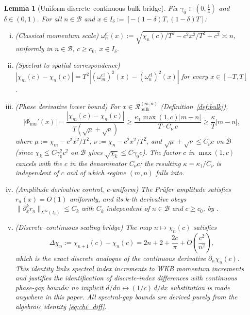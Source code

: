 \documentclass[12pt,a4paper]{amsart}
\newtheorem{lemma}[theorem]{Lemma}
\theoremstyle{definition}
\newcommand{\Rbulk}{\mathcal{R}_{\mathrm{bulk}}}
\begin{document}
\begin{lemma}[Uniform discrete--continuous bulk bridge]%
\label{lem:discrete_continuous_bridge}
Fix $\gamma_0\in(0,\tfrac{1}{4})$ and $\delta\in(0,1)$. For all
$n\in\mathcal{B}$ and $x\in I_\delta:=[-(1-\delta)T,(1-\delta)T]$:
\begin{enumerate}[(i)]
\item \textup{(Classical momentum scale)}
  $\omega_n^{\mathrm{cl}}(x)
  :=\sqrt{\chi_n(c)/T^2-c^2x^2/T^2+c^2}\asymp n$,
  uniformly in $n\in\mathcal{B}$, $c\ge c_0$, $x\in I_\delta$.
\item \textup{(Spectral-to-spatial correspondence)}
  $|\chi_m(c)-\chi_n(c)|
  =T^2|(\omega_m^{\mathrm{cl}})^2(x)-(\omega_n^{\mathrm{cl}})^2(x)|$
  for every $x\in[-T,T]$.
\item \textup{(Phase derivative lower bound)}
  For $x\in\Rbulk^{(m,n)}$ (Definition~\ref{def:bulk}),
  \[
    |\Phi_{mn}'(x)|
    =\frac{|\chi_m(c)-\chi_n(c)|}{T(\sqrt\mu+\sqrt\nu)}
    \ge\frac{\kappa_1\max(1,c)|m-n|}{T\cdot C_\nu\,c}
    \ge\frac{\kappa}{T}|m-n|,
  \]
  where $\mu:=\chi_m-c^2x^2/T^2$, $\nu:=\chi_n-c^2x^2/T^2$, and
  $\sqrt\mu+\sqrt\nu\le C_\nu c$ on $\mathcal{B}$ (since
  $\chi_k\le C\gamma_0^2 c^2$ on $\mathcal{B}$ gives
  $\sqrt{\chi_k}\le C\gamma_0 c$). The factor $c$ in $\max(1,c)$
  cancels with the $c$ in the denominator $C_\nu c$; the resulting
  $\kappa=\kappa_1/C_\nu$ is independent of $c$ and of which
  regime $(m,n)$ falls into.
\item \textup{(Amplitude derivative control, c-uniform)}
  The Pr\"ufer amplitude satisfies $r_n(x)=O(1)$ uniformly,
  and its $k$-th derivative obeys
  $\|\partial_x^k r_n\|_{L^\infty(I_\delta)}\le C_k$
  with $C_k$ independent of $n\in\mathcal{B}$ and $c\ge c_0$,
  by \cite[Lemma~2.4, Lemma~3.5]{PaperIV}.
\item \textup{(Discrete--continuous scaling bridge)}
  The map $n\mapsto\chi_n(c)$ satisfies
  \[
    \Delta\chi_n:=\chi_{n+1}(c)-\chi_n(c)
    =2n+2+\frac{2c}{\pi}
      +O\!\left(\frac{c^2}{n^2}\right),
  \]
  which is the \emph{exact discrete analogue} of the continuous
  derivative $\partial_n\chi_n(c)$. This identity links spectral
  index increments to WKB momentum increments and justifies the
  identification of discrete-index differences with continuous
  phase-gap bounds: no implicit $d/dn\leftrightarrow(1/c)\,d/dx$
  substitution is made anywhere in this paper. All spectral-gap
  bounds are derived purely from the algebraic identity
  \eqref{eq:chi_diff}.
\end{enumerate}
\end{lemma}
\end{document}
